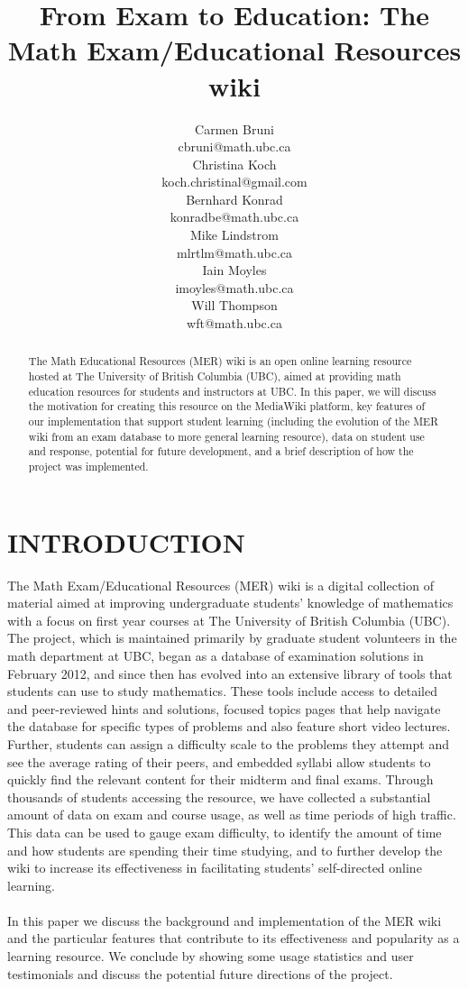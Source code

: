 \documentclass{primus}
\title{From Exam to Education: The Math Exam/Educational Resources wiki
}
\author{Carmen Bruni\\
cbruni@math.ubc.ca\\[0.3cm]
Christina Koch\\
koch.christinal@gmail.com\\[0.3cm]
Bernhard Konrad\\
konradbe@math.ubc.ca\\[0.3cm]
Mike Lindstrom\\
mlrtlm@math.ubc.ca\\[0.3cm]
Iain Moyles\\
imoyles@math.ubc.ca\\[0.3cm]
Will Thompson\\
wft@math.ubc.ca
}
\begin{document}
\makePtitlepage
\makePtitle

\begin{abstract}
The Math Educational Resources (MER) wiki is an open online learning resource hosted at The University of British Columbia (UBC), aimed at providing math education resources for students and instructors at UBC.  In this paper, we will discuss the motivation for creating this resource on the MediaWiki platform, key features of our implementation that support student learning (including the evolution of the MER wiki from an exam database to more general learning resource), data on student use and response, potential for future development, and a brief description of how the project was implemented.
\end{abstract}

\listkeywords

\section{INTRODUCTION}\label{sec:Introduction}

The Math Exam/Educational Resources (MER) wiki is a digital collection of material aimed at improving undergraduate students’ knowledge of mathematics with a focus on first year courses at The University of British Columbia (UBC). The project, which is  maintained primarily by graduate student volunteers in the math department at UBC, began as a database of examination solutions in February 2012, and since then has evolved into an extensive library of tools that students can use to study mathematics.  These tools include access to detailed and peer-reviewed hints and solutions, focused topics pages that help navigate the database for specific types of problems and also feature short video lectures. Further, students can assign a difficulty scale to the problems they attempt and see the average rating of their peers, and embedded syllabi allow students to quickly find the relevant content for their midterm and final exams. Through thousands of students accessing the resource, we have collected a substantial amount of data on exam and course usage, as well as time periods of high traffic. This data can be used to gauge exam difficulty, to identify the amount of time and how students are spending their time studying, and to further develop the wiki to increase its effectiveness in facilitating students’ self-directed online learning.
\\\\
\noindent{}In this paper we discuss the background and implementation of the MER wiki and the particular features that contribute to its effectiveness and popularity as a learning resource.  We conclude by showing some usage statistics and user testimonials and discuss the potential future directions of the project.
\end{document}
